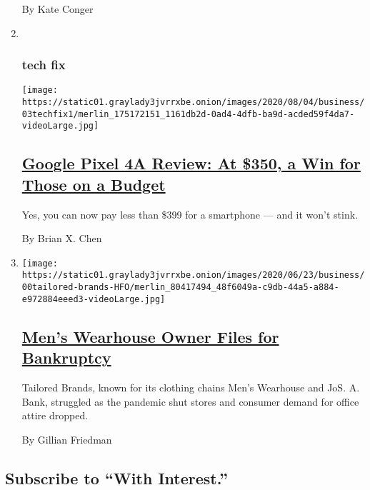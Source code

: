 \begin{enumerate}
  By Kate Conger
\item ~
  \hypertarget{tech-fix}{%
  \subsubsection{tech fix}\label{tech-fix}}

  \texttt{[image: https://static01.graylady3jvrrxbe.onion/images/2020/08/04/business/03techfix1/merlin\_175172151\_1161db2d-0ad4-4dfb-ba9d-acded59f4da7-videoLarge.jpg]}

  \hypertarget{google-pixel-4a-review-at-350-a-win-for-those-on-a-budget}{%
  \subsection{\texorpdfstring{\href{/2020/08/03/technology/personaltech/google-pixel-4a-review.html}{Google
  Pixel 4A Review: At \$350, a Win for Those on a
  Budget}}{Google Pixel 4A Review: At \$350, a Win for Those on a Budget}}\label{google-pixel-4a-review-at-350-a-win-for-those-on-a-budget}}

  Yes, you can now pay less than \$399 for a smartphone --- and it won't
  stink.

  By Brian X. Chen
\item
  \texttt{[image: https://static01.graylady3jvrrxbe.onion/images/2020/06/23/business/00tailored-brands-HFO/merlin\_80417494\_48f6049a-c9db-44a5-a884-e972884eeed3-videoLarge.jpg]}

  \hypertarget{mens-wearhouse-owner-files-for-bankruptcy}{%
  \subsection{\texorpdfstring{\href{/2020/08/03/business/tailored-brands-mens-wearhouse-bankruptcy.html}{Men's
  Wearhouse Owner Files for
  Bankruptcy}}{Men's Wearhouse Owner Files for Bankruptcy}}\label{mens-wearhouse-owner-files-for-bankruptcy}}

  Tailored Brands, known for its clothing chains Men's Wearhouse and
  JoS. A. Bank, struggled as the pandemic shut stores and consumer
  demand for office attire dropped.

  By Gillian Friedman
\end{enumerate}

\hypertarget{subscribe-to-with-interest}{%
\subsection{Subscribe to ``With
Interest.''}\label{subscribe-to-with-interest}}

